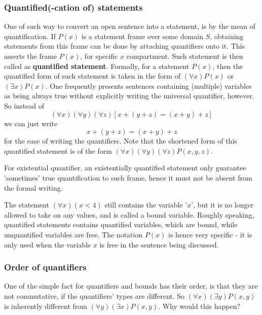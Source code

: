 \subsubsection{Quantified(-cation of) statements}
One of such way to convert an open sentence into a statement, is by the mean of  quantification. If $P(x)$ is a statement frame over some domain $S$, obtaining statements from this frame can be done by attaching quantifiers onto it. This asserts the frame $P(x)$, for specific $x$ compartment. Such statement is then called as  \textbf{quantified statement}. Formally, for a statement $P(x)$, then the quantified form of such statement is taken in the form of $(\forall x) P(x)$ or $(\exists x)P(x)$. One frequently presents sentences containing (multiple) variables as being always true without explicitly writing the universal quantifier, however. So instead of 
\begin{equation*}
    (\forall x) (\forall y) (\forall z) [x+(y+z)=(x+y)+z]
\end{equation*}
we can just write
\begin{equation*}
    x+(y+z)=(x+y)+z
\end{equation*}
for the ease of writing the quantifiers. Note that the shortened form of this quantified statement is of the form $(\forall x)(\forall y)(\forall z)P(x,y,z)$. 

For existential quantifier, an existentially quantified statement only guarantee 'sometimes' true quantification to such frame, hence it must not be absent from the formal writing. 

The statement $(\forall x) (x< 4)$ still contains the variable '$x$', but it is no longer allowed to take on any values, and is called a bound variable. Roughly speaking, quantified statements contains quantified variables, which are bound, while unquantified variables are free. The notation $P(x)$ is hence very specific - it is only used when the variable $x$ is free in the sentence being discussed. 

\subsubsection{Order of quantifiers}
One of the simple fact for quantifiers and bounds has their order, is that they are not commutative, if the quantifiers' types are different. So $(\forall x)(\exists y)P(x,y)$ is inherently different from $(\forall y)(\exists x)P(x,y)$. Why would this happen? 

